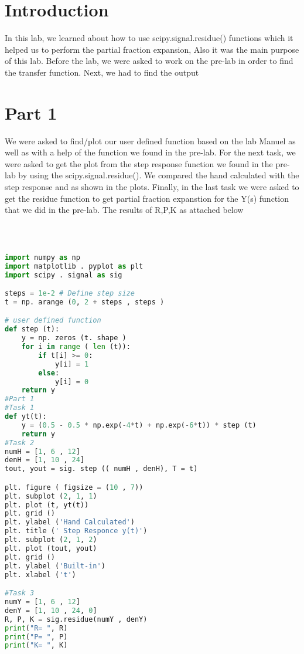 \documentclass[12pt]{report}
\begin{document}
\section{Introduction}
 

In this lab, we learned about how to use scipy.signal.residue() functions which it helped us to perform the partial fraction expansion, Also it was the main purpose of this lab. Before the lab, we were asked to work on the pre-lab in order to find the transfer function. Next, we had to find the output 




\section{Part 1}

We were asked to find/plot our user defined function based on the lab Manuel as well as with a help of the function we found in the pre-lab. For the next task, we were asked to get the plot from the step response function we found in the pre-lab by using the scipy.signal.residue(). We compared the hand calculated with the step response and as shown in the plots. Finally, in the last task we were asked to get the residue function to get partial fraction expanstion for the Y(s) function that we did in the pre-lab. The results of R,P,K as attached below 





\begin{lstlisting}[language=Python]



import numpy as np
import matplotlib . pyplot as plt
import scipy . signal as sig

steps = 1e-2 # Define step size
t = np. arange (0, 2 + steps , steps ) 

# user defined function
def step (t): 
    y = np. zeros (t. shape ) 
    for i in range ( len (t)): 
        if t[i] >= 0:  
            y[i] = 1
        else:
            y[i] = 0
    return y 
#Part 1
#Task 1
def yt(t):
    y = (0.5 - 0.5 * np.exp(-4*t) + np.exp(-6*t)) * step (t) 
    return y
#Task 2
numH = [1, 6 , 12]
denH = [1, 10 , 24]
tout, yout = sig. step (( numH , denH), T = t)

plt. figure ( figsize = (10 , 7))
plt. subplot (2, 1, 1)
plt. plot (t, yt(t))
plt. grid ()
plt. ylabel ('Hand Calculated')
plt. title (' Step Responce y(t)')
plt. subplot (2, 1, 2)
plt. plot (tout, yout)
plt. grid ()
plt. ylabel ('Built-in')
plt. xlabel ('t')

#Task 3
numY = [1, 6 , 12]
denY = [1, 10 , 24, 0]
R, P, K = sig.residue(numY , denY)
print("R= ", R)
print("P= ", P)
print("K= ", K)








\end{lstlisting}
\end{document}
